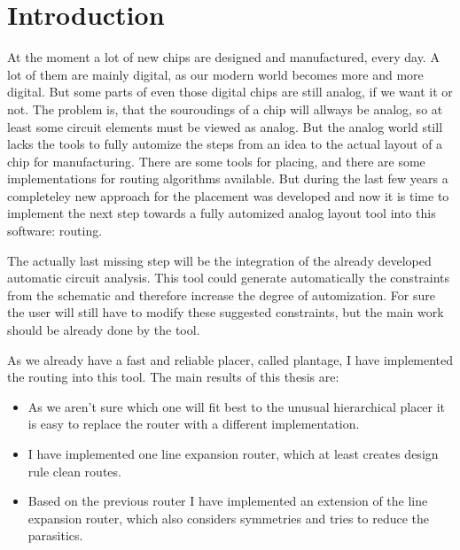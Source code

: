 \chapter{Introduction}

At the moment a lot of new chips are designed and manufactured, every day. A lot of them are mainly digital, as our modern world becomes more and more digital. But some parts of even those digital chips are still analog, if we want it or not. The problem is, that the souroudings of a chip will allways be analog, so at least some circuit elements must be viewed as analog. But the analog world still lacks the tools to fully automize the steps from an idea to the actual layout of a chip for manufacturing. There are some tools for placing, and there are some implementations for routing algorithms available. But during the last few years a completeley new approach for the placement was developed and now it is time to implement the next step towards a fully automized analog layout tool into this software: routing.

The actually last missing step will be the integration of the already developed automatic circuit analysis. This tool could generate automatically the constraints from the schematic and therefore increase the degree of automization. For sure the user will still have to modify these suggested constraints, but the main work should be already done by the tool.

As we already have a fast and reliable placer, called plantage, I have implemented the routing into this tool. The main results of this thesis are:
\begin{itemize}
\item As we aren't sure which one will fit best to the unusual hierarchical placer it is easy to replace the router with a different implementation.
\item I have implemented one line expansion router, which at least creates design rule clean routes.
\item Based on the previous router I have implemented an extension of the line expansion router, which also considers symmetries and tries to reduce the parasitics.
\end{itemize}